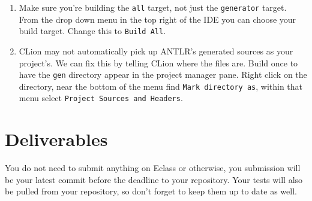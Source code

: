 \documentclass{article}
\newcommand{\code}[1]{\texttt{\textmd{#1}}}
\begin{document}
\begin{enumerate}
\begin{enumerate}
    \end{enumerate}
  \item
    Make sure you're building the \texttt{all} target, not just the \texttt{generator} target.
    From the drop down menu in the top right of the IDE you can choose your build target. Change
    this to \texttt{Build All}.
  \item
    CLion may not automatically pick up ANTLR's generated sources as your project's. We can fix
    this by telling CLion where the files are. Build once to have the \code{gen} directory appear
    in the project manager pane. Right click on the directory, near the bottom of the menu find
    \texttt{Mark directory as}, within that menu select \texttt{Project Sources and Headers}.
\end{enumerate}

\section{Deliverables}
You do not need to submit anything on Eclass or otherwise, you submission will be your latest
commit before the deadline to your repository. Your tests will also be pulled from your repository,
so don't forget to keep them up to date as well.
\end{document}
